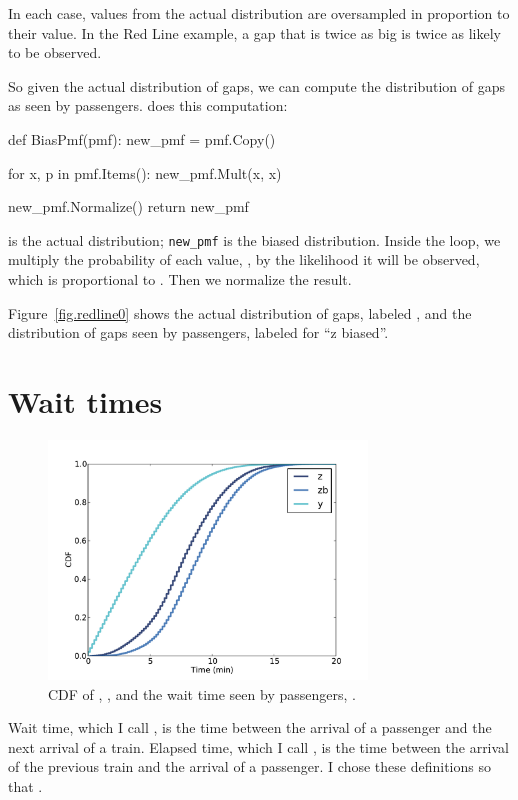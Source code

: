 \documentclass[12pt]{book}
\theoremstyle{exercise}
\begin{document}
In each case, values from the actual distribution are
oversampled in proportion to their value.  In the Red Line example,
a gap that is twice as big is twice as likely to be observed.

So given the actual distribution of gaps, we can compute the
distribution of gaps as seen by passengers.  
does this computation:

\begin{code}
def BiasPmf(pmf):
    new_pmf = pmf.Copy()

    for x, p in pmf.Items():
        new_pmf.Mult(x, x)
        
    new_pmf.Normalize()
    return new_pmf
\end{code}

 is the actual distribution; \verb"new_pmf" is the
biased distribution.  Inside the loop, we multiply the
probability of each value, , by the likelihood it will
be observed, which is proportional to .  Then we
normalize the result.

Figure~\ref{fig.redline0} shows the actual distribution of gaps,
labeled , and the distribution of gaps seen by passengers,
labeled  for ``z biased''.


\section{Wait times}

\begin{figure}
\centerline{\includegraphics[height=2.5in]{figs/redline2.pdf}}
\caption{CDF of , , and the wait time seen
by passengers, . }
\label{fig.redline2}
\end{figure}

Wait time, which I call , is the time between the arrival
of a passenger and the next arrival of a train.  Elapsed time, which I
call , is the time between the arrival of the previous
train and the arrival of a passenger.  I chose these definitions
so that .
\end{document}
